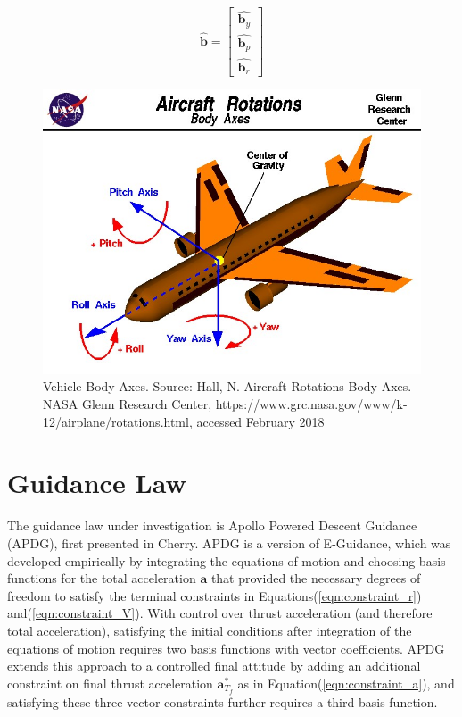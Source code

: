 \begin{equation}
\label{eqn:bodyframe}
\hat{\bm{b}} = 
\begin{bmatrix}
\hat{\bm{b}_y} \\
\hat{\bm{b}_p} \\
\hat{\bm{b}_r}
\end{bmatrix}
\end{equation}

\begin{figure}[H]
	\centering
	\begin{minipage}{4.3 in}
		\includegraphics[width=\linewidth]{Figures/bodyaxes.jpg}
		\caption{Vehicle Body Axes. Source: Hall, N. Aircraft Rotations Body Axes. NASA Glenn Research Center, https://www.grc.nasa.gov/www/k-12/airplane/rotations.html, accessed February 2018 \label{fig:bodyaxes} }
	\end{minipage}
\end{figure}

\section{Guidance Law} \label{sec:guidancelaw}
The guidance law under investigation is Apollo Powered Descent Guidance (APDG), first presented in Cherry\:\cite{CHERRY}. APDG is a version of E-Guidance, which was developed empirically by integrating the equations of motion and choosing basis functions for the total acceleration $\bm{a}$ that provided the necessary degrees of freedom to satisfy the terminal constraints in Equations\:(\ref{eqn:constraint_r}) and\:(\ref{eqn:constraint_V}). With control over thrust acceleration (and therefore total acceleration), satisfying the initial conditions after integration of the equations of motion requires two basis functions with vector coefficients. APDG extends this approach to a controlled final attitude by adding an additional constraint on final thrust acceleration $\bm{a}^*_{T_f}$ as in Equation\:(\ref{eqn:constraint_a}), and satisfying these three vector constraints further requires a third basis function. 

